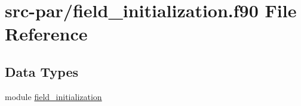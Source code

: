 \hypertarget{field__initialization_8f90}{\section{src-\/par/field\-\_\-initialization.f90 File Reference}
\label{field__initialization_8f90}
}
\subsection*{Data Types}
\begin{DoxyCompactItemize}
\item 
module \hyperlink{classfield__initialization}{field\-\_\-initialization}
\end{DoxyCompactItemize}
